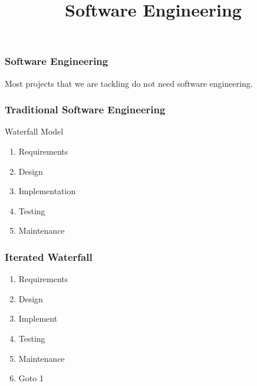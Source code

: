 
\title{Software Engineering}

\frame{\maketitle}

\begin{frame}[fragile]
\frametitle{Software Engineering}
Most projects that we are tackling do not need software engineering.

\end{frame}

\begin{frame}[fragile]
\frametitle{Traditional Software Engineering}

\begin{block}{Waterfall Model}
\begin{enumerate}
\item Requirements
\item Design
\item Implementation
\item Testing
\item Maintenance
\end{enumerate}
\end{block}
\end{frame}

\begin{frame}[fragile]
\frametitle{Iterated Waterfall}

\begin{enumerate}
\item Requirements
\item Design
\item Implement
\item Testing
\item Maintenance
\item Goto 1
\end{enumerate}
\end{frame}

